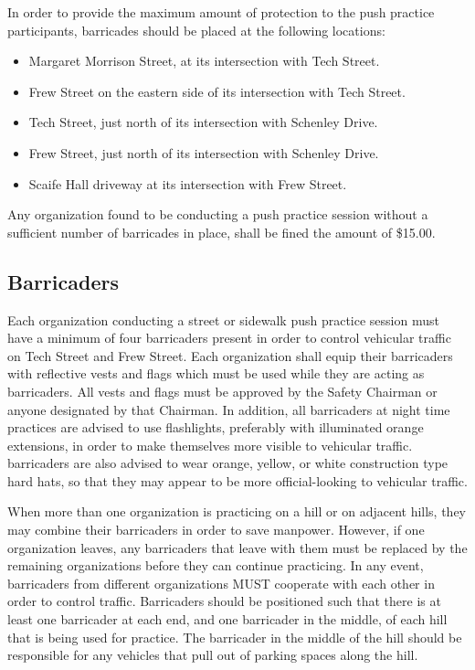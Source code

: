	In order to provide the maximum amount of protection to the push practice participants, barricades should be placed at the following locations:

	\begin{itemize}

		\item Margaret Morrison Street, at its intersection with Tech Street.

		\item Frew Street on the eastern side of its intersection with Tech Street.

		\item Tech Street, just north of its intersection with Schenley Drive.

		\item Frew Street, just north of its intersection with Schenley Drive.

		\item Scaife Hall driveway at its intersection with Frew Street.

	\end{itemize}

	Any organization found to be conducting a push practice session without a sufficient number of barricades in place, shall be fined the amount of \$15.00.

\subsection{Barricaders}

	Each organization conducting a street or sidewalk push practice session must have a minimum of four barricaders present in order to control vehicular traffic on Tech Street and Frew Street. Each organization shall equip their barricaders with reflective vests and flags which must be used while they are acting as barricaders. All vests and flags must be approved by the Safety Chairman or anyone designated by that Chairman. In addition, all barricaders at night time practices are advised to use flashlights, preferably with illuminated orange extensions, in order to make themselves more visible to vehicular traffic. barricaders are also advised to wear orange, yellow, or white construction type hard hats, so that they may appear to be more official-looking to vehicular traffic.

	When more than one organization is practicing on a hill or on adjacent hills, they may combine their barricaders in order to save manpower. However, if one organization leaves, any barricaders that leave with them must be replaced by the remaining organizations before they can continue practicing. In any event, barricaders from different organizations MUST cooperate with each other in order to control traffic. Barricaders should be positioned such that there is at least one barricader at each end, and one barricader in the middle, of each hill that is being used for practice. The barricader in the middle of the hill should be responsible for any vehicles that pull out of parking spaces along the hill.


